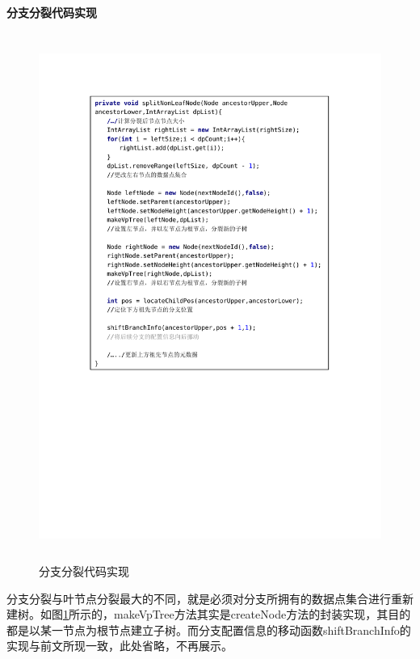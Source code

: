 \textbf{分支分裂代码实现}
\begin{figure}[H]
  \centering
  \includegraphics[width=6in,height=6.8in]{new_FIGs/chapter4/insert-code3.pdf}
  \caption{分支分裂代码实现}\label{branch-split}
\end{figure}
分支分裂与叶节点分裂最大的不同，就是必须对分支所拥有的数据点集合进行重新建树。如图\ref{branch-split}所示的，makeVpTree方法其实是createNode方法的封装实现，其目的都是以某一节点为根节点建立子树。而分支配置信息的移动函数shiftBranchInfo的实现与前文所现一致，此处省略，不再展示。
